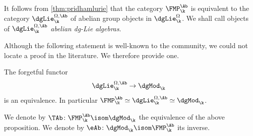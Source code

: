 It follows from \autoref{thm:pridhamlurie} that the category $\FMP^\Ab_\k$ is equivalent to the category $\dgLie_\k^{\Omega,\Ab}$ of abelian group objects in $\dgLie^\Omega_\k$. We shall call objects of $\dgLie_\k^{\Omega,\Ab}$ \emph{abelian dg-Lie algebras}.

Although the following statement is well-known to the community, we could not locate a proof in the literature. We therefore provide one.
\begin{prop}\label{prop:abelianlie}
The forgetful functor
\[
\dgLie_\k^{\Omega,\Ab} \to \dgMod_\k
\]
is an equivalence. In particular $\FMP_\k^\Ab \simeq \dgLie_\k^{\Omega,\Ab} \simeq \dgMod_\k$.
\end{prop}

\begin{df}
We denote by $\TAb \colon \FMP_\k^\Ab \isom \dgMod_\k$ the equivalence of the above proposition. We denote by $\eAb \colon \dgMod_\k \isom \FMP_\k^\Ab$ its inverse.
\end{df}

